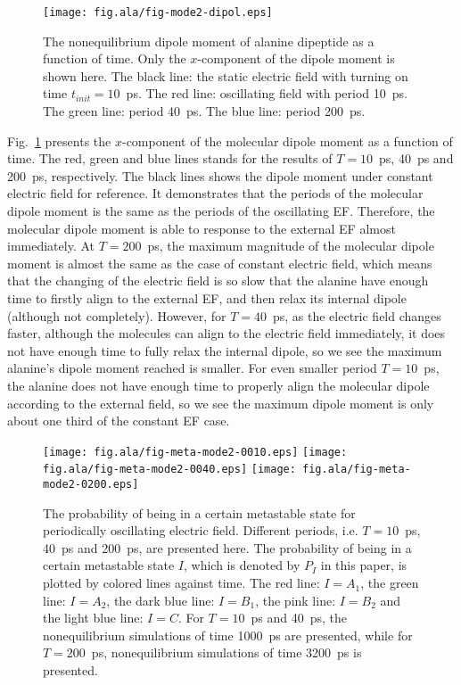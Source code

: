\documentclass[aip,jcp,a4paper,preprint,onecolumn]{revtex4-1}
\begin{document}
\begin{figure}
  \centering
  \texttt{[image: fig.ala/fig-mode2-dipol.eps]}
  \caption{The nonequilibrium dipole moment of alanine dipeptide as a
    function of time. Only the $x$-component of the dipole moment is
    shown here. The black line: the static electric field with turning on
    time $t_{init} = 10$~ps. The red line: oscillating field with period
    10~ps. The green line: period 40~ps. The blue line: period 200~ps.}
  \label{fig:tmp8}
\end{figure}


Fig.~\ref{fig:tmp8} presents the $x$-component of the molecular dipole moment as
a function of time. The red, green and blue lines stands for the
results of $T=10$~ps, 40~ps and 200~ps, respectively. The black lines
shows the dipole moment under constant electric field
for reference.
It demonstrates that the periods of the molecular dipole moment
is the same as the periods of the oscillating EF. Therefore,
the molecular dipole moment
is able to response to the external EF almost immediately.
At $T=200$~ps, the maximum magnitude of the molecular
dipole moment is almost the same as the case of constant electric field, which
means that the changing of the electric field is so slow that the
alanine have enough time to firstly align to the external EF, and then
relax its internal dipole (although not completely). However,
for $T=40$~ps, as the electric field changes faster,
although the molecules can align to the electric field immediately,
it does not have enough time to fully relax the internal dipole, so we
see the maximum alanine's dipole moment reached is smaller.
For even smaller period $T=10$~ps, the alanine does not have enough
time  to properly align the molecular dipole according to the external
field, so we see the maximum dipole moment is only about one third of the
constant EF case.

\begin{figure}
  \centering
  \texttt{[image: fig.ala/fig-meta-mode2-0010.eps]}
  \texttt{[image: fig.ala/fig-meta-mode2-0040.eps]}
  \texttt{[image: fig.ala/fig-meta-mode2-0200.eps]}
  \caption{ The probability of being in a certain metastable state for
    periodically oscillating electric field. Different periods,
    i.e. $T=10$~ps, 40~ps and 200~ps, are presented here.  The
    probability of being in a certain metastable state $I$, which is
    denoted by $P_I$ in this paper, is plotted by colored lines against
    time. The red line: $I = A_1$, the green line: $I = A_2$, the dark
    blue line: $I = B_1$, the pink line: $I = B_2$ and the light blue
    line: $I = C$. For $T=10$~ps and 40~ps, the nonequilibrium
    simulations of time 1000~ps are presented, while for $T=200$~ps,
    nonequilibrium simulations of time 3200~ps is presented.  }
  \label{fig:tmp9}
\end{figure}
\end{document}
